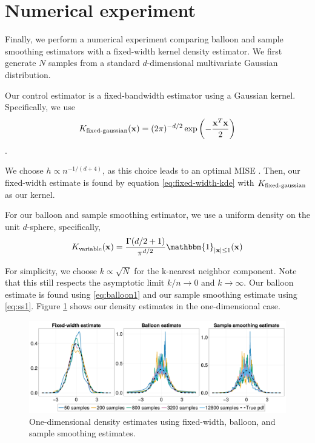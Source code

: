 \documentclass{article}
\begin{document}
\section{Numerical experiment}

Finally, we perform a numerical experiment comparing balloon and sample smoothing estimators with a fixed-width kernel density estimator. We first generate $N$ samples from a standard $d$-dimensional multivariate Gaussian distribution.

Our control estimator is a fixed-bandwidth estimator using a Gaussian kernel. Specifically, we use
\begin{equation}
    K_\textup{fixed-gaussian}(\mathbf{x}) = (2\pi)^{-d/2}\exp\left(-\frac{\mathbf{x}^T\mathbf{x}}{2}\right)
\end{equation}.

We choose $h \propto n^{-1/(d+4)}$, as this choice leads to an optimal MISE \cite{jnw}. Then, our fixed-width estimate is found by equation \eqref{eq:fixed-width-kde} with $K_\textup{fixed-gaussian}$ as our kernel.

For our balloon and sample smoothing estimator, we use a uniform density on the unit $d$-sphere, specifically,
\begin{equation}
    K_{\textup{variable}}(\mathbf{x}) = \frac{\Gamma(d/2+1)}{\pi^{d/2}}\mathbbm{1}_{\vert\mathbf{x}\vert\leq1}(\mathbf{x})
\end{equation}

For simplicity, we choose $k \propto \sqrt{N}$ for the k-nearest neighbor component. Note that this still respects the asymptotic limit $k/n \rightarrow 0$ and $k\rightarrow \infty$. Our balloon estimate is found using \eqref{eq:balloon1} and our sample smoothing estimate using \eqref{eq:ss1}. Figure \ref{fig:1d-visual} shows our density estimates in the one-dimensional case. 

\begin{figure}
    \centering
    \includegraphics[width=\linewidth]{images/1D_visual.png}
    \caption{One-dimensional density estimates using fixed-width, balloon, and sample smoothing estimates.}
    \label{fig:1d-visual}
\end{figure}
\end{document}
